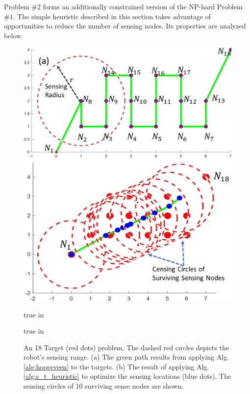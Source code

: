 \documentclass[letterpaper, 10 pt, conference]{ieeeconf}
\theoremstyle{definition}
\begin{document}
\noindent Problem $\# 2$ forms an additionally constrained version of the NP-hard Problem $\# 1$.  The simple heuristic described in this section takes advantage of opportunities to reduce the number of sensing nodes. Its properties are analyzed below.\vspace{-11pt}
%
\begin{figure}
  \centerline{\includegraphics[height=1.2 true in]{Overlap18a.jpg}}
  \centerline{\includegraphics[height=1.4 true in]{Overlap18b.jpg}}
     true in
  \caption{An 18 Target (red dots) problem. The dashed red circles depicts the robot's sensing range. (a) The green path results from applying  Alg. \ref{alg:hoogeveen} to the targets.  (b) The result of applying  Alg. \ref{alg:s_t_heuristic} to optimize the sensing  locations (blue dots). The sensing circles of  10 surviving sense nodes are shown.}
  \label{fig:overlap1}
   true in
\end{figure}
\end{document}
